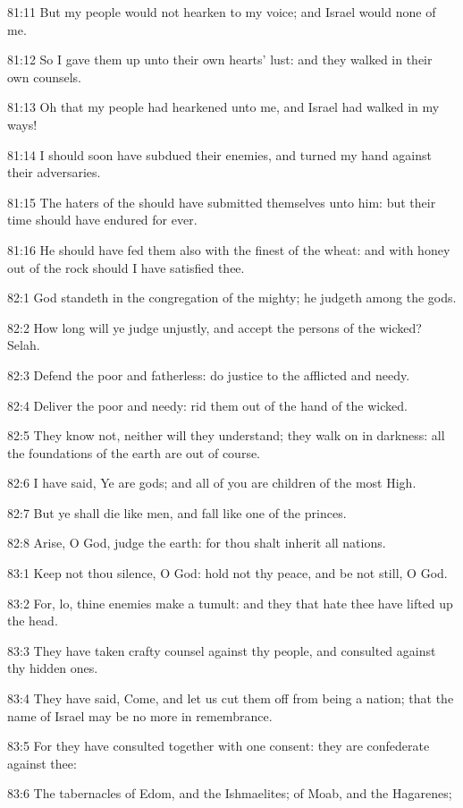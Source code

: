 81:11 But my people would not hearken to my voice; and Israel would
none of me.

81:12 So I gave them up unto their own hearts' lust: and they walked
in their own counsels.

81:13 Oh that my people had hearkened unto me, and Israel had walked
in my ways!

81:14 I should soon have subdued their enemies, and turned my hand
against their adversaries.

81:15 The haters of the \LORD should have submitted themselves unto
him: but their time should have endured for ever.

81:16 He should have fed them also with the finest of the wheat: and
with honey out of the rock should I have satisfied thee.



82:1 God standeth in the congregation of the mighty; he judgeth among
the gods.

82:2 How long will ye judge unjustly, and accept the persons of the
wicked? Selah.

82:3 Defend the poor and fatherless: do justice to the afflicted and
needy.

82:4 Deliver the poor and needy: rid them out of the hand of the
wicked.

82:5 They know not, neither will they understand; they walk on in
darkness: all the foundations of the earth are out of course.

82:6 I have said, Ye are gods; and all of you are children of the most
High.

82:7 But ye shall die like men, and fall like one of the princes.

82:8 Arise, O God, judge the earth: for thou shalt inherit all
nations.



83:1 Keep not thou silence, O God: hold not thy peace, and be not
still, O God.

83:2 For, lo, thine enemies make a tumult: and they that hate thee
have lifted up the head.

83:3 They have taken crafty counsel against thy people, and consulted
against thy hidden ones.

83:4 They have said, Come, and let us cut them off from being a
nation; that the name of Israel may be no more in remembrance.

83:5 For they have consulted together with one consent: they are
confederate against thee:

83:6 The tabernacles of Edom, and the Ishmaelites; of Moab, and the
Hagarenes;

